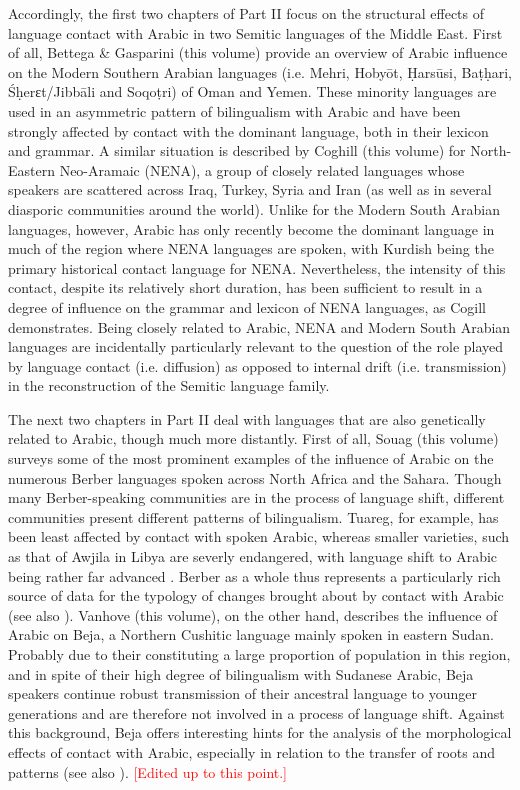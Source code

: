 \documentclass[output=paper]{langsci/langscibook}
\begin{document}
Accordingly, the first two chapters of Part II focus on the structural effects of language contact with Arabic in two Semitic languages of the Middle East. First of all, Bettega \& Gasparini (this volume) provide an overview of Arabic influence on the Modern Southern Arabian languages (i.e. Mehri, Hobyōt, Ḥarsūsi, Baṭḥari, Śḥerɛt/Jibbāli and Soqoṭri) of Oman and Yemen. These minority languages are used in an asymmetric pattern of bilingualism with Arabic and have been strongly affected by contact with the dominant language, both in their lexicon and grammar. A similar situation is described by Coghill (this volume) for North-Eastern Neo-Aramaic (NENA), a group of closely related languages whose speakers are scattered across Iraq, Turkey, Syria and Iran (as well as in several diasporic communities around the world). Unlike for the Modern South Arabian languages, however, Arabic has only recently become the dominant language in much of the region where NENA languages are spoken, with Kurdish being the primary historical contact language for NENA. Nevertheless, the intensity of this contact, despite its relatively short duration, has been sufficient to result in a degree of influence on the grammar and lexicon of NENA languages, as Cogill demonstrates. Being closely related to Arabic, NENA and Modern South Arabian languages are incidentally particularly relevant to the question of the role played by language contact (i.e. diffusion) as opposed to internal drift (i.e. transmission) in the reconstruction of the Semitic language family.

The next two chapters in Part II deal with languages that are also genetically related to Arabic, though much more distantly. First of all, Souag (this volume) surveys some of the most prominent examples of the influence of Arabic on the numerous Berber languages spoken across North Africa and the Sahara. Though many Berber-speaking communities are in the process of language shift, different communities present different patterns of bilingualism. Tuareg, for example, has been least affected by contact with spoken Arabic, whereas smaller varieties, such as that of Awjila in Libya are severly endangered, with language shift to Arabic being rather far advanced \citep{vanPuttenSouag2015}. Berber as a whole thus represents a particularly rich source of data for the typology of changes brought about by contact with Arabic (see also \citealt{Kossmann2013book}). Vanhove (this volume), on the other hand, describes the influence of Arabic on Beja, a Northern Cushitic language mainly spoken in eastern Sudan. Probably due to their constituting a large proportion of population in this region, and in spite of their high degree of bilingualism with Sudanese Arabic, Beja speakers continue robust transmission of their ancestral language to younger generations and are therefore not involved in a process of language shift. Against this background, Beja offers interesting hints for the analysis of the morphological effects of contact with Arabic, especially in relation to the transfer of roots and patterns (see also \citealt{Vanhove2012}). \textcolor{red}{[Edited up to this point.]}
\end{document}
